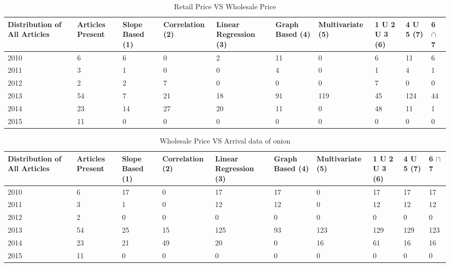 	
	
	
	\begin{table}[]
	\centering
	\resizebox{\textwidth}{!}
	{\begin{tabular}{|l|l|l|l|l|l|l|l|l|l|}
	\hline
	Distribution of All Articles & Articles Present & Slope Based (1) & Correlation (2) & Linear Regression (3) & Graph Based (4) & Multivariate (5) & 1 U 2 U 3 (6) & 4 U 5 (7) & 6 $\cap$ 7 \\
	\hline
	2010 & 6  & 6  & 0  & 2  & 11 & 0   & 6  & 11  & 6  \\
	\hline
	2011 & 3  & 1  & 0  & 0  & 4  & 0   & 1  & 4   & 1  \\
	\hline
	2012 & 2  & 2  & 7  & 0  & 0  & 0   & 7  & 0   & 0  \\
	\hline
	2013 & 54 & 7  & 21 & 18 & 91 & 119 & 45 & 124 & 44 \\
	\hline
	2014 & 23 & 14 & 27 & 20 & 11 & 0   & 48 & 11  & 1  \\
	\hline
	2015 & 11 & 0  & 0  & 0  & 0  & 0   & 0  & 0   & 0 \\
	\hline
	\end{tabular}}	
	\caption{Retail Price VS Wholesale Price}
	\label{RetailVsWholesale}
	\end{table}

	
	
	\begin{table}[]
	\centering
	\resizebox{\textwidth}{!}
	{\begin{tabular}{|l|l|l|l|l|l|l|l|l|l|}
	\hline
	Distribution of All Articles & Articles Present & Slope Based (1) & Correlation (2) & Linear Regression (3) & Graph Based (4) & Multivariate (5) & 1 U 2 U 3 (6) & 4 U 5 (7) & 6 $\cap$ 7  \\
	\hline
	2010 & 6  & 17 & 0  & 17  & 17 & 0   & 17  & 17  & 17  \\
	\hline
	2011 & 3  & 1  & 0  & 12  & 12 & 0   & 12  & 12  & 12  \\
	\hline
	2012 & 2  & 0  & 0  & 0   & 0  & 0   & 0   & 0   & 0   \\
	\hline
	2013 & 54 & 25 & 15 & 125 & 93 & 123 & 129 & 129 & 123 \\
	\hline
	2014 & 23 & 21 & 49 & 20  & 0  & 16  & 61  & 16  & 16  \\
	\hline
	2015 & 11 & 0  & 0  & 0   & 0  & 0   & 0   & 0   & 0   \\
	\hline
	\end{tabular}}	
	\caption{ Wholesale Price VS Arrival data of onion}
	\label{WholesaleVsArrival}
	\end{table}
	
